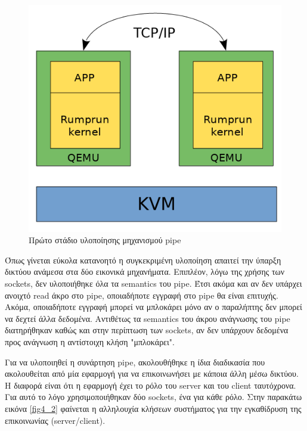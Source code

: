 \begin{figure}[htp]
\centering
\includegraphics[scale=0.7]{figures/pipe_stage1_function.png}
\caption{Πρώτο στάδιο υλοποίησης μηχανισμού pipe\label{fig4_1}}
\end{figure}

Όπως γίνεται εύκολα κατανοητό η συγκεκριμένη υλοποίηση απαιτεί την ύπαρξη
δικτύου ανάμεσα στα δύο εικονικά μηχανήματα. Επιπλέον, λόγω της χρήσης των
sockets, δεν υλοποιήθηκε όλα τα semantics του pipe. Έτσι ακόμα και αν δεν
υπάρχει ανοιχτό read άκρο στο pipe, οποιαδήποτε εγγραφή στο pipe θα είναι
επιτυχής. Ακόμα, οποιαδήποτε εγγραφή μπορεί να μπλοκάρει μόνο αν ο παραλήπτης
δεν μπορεί να δεχτεί άλλα δεδομένα. Αντιθέτως τα semantics του άκρου ανάγνωσης
του pipe διατηρήθηκαν καθώς και στην περίπτωση των sockets, αν δεν υπάρχουν
δεδομένα προς ανάγνωση η αντίστοιχη κλήση "μπλοκάρει". 

Για να υλοποιηθεί η συνάρτηση pipe, ακολουθήθηκε η ίδια διαδικασία που
ακολουθείται από μία εφαρμογή για να επικοινωνήσει με κάποια άλλη μέσω δικτύου.
Η διαφορά είναι ότι η εφαρμογή έχει το ρόλο του server και του client
ταυτόχρονα. Για αυτό το λόγο χρησιμοποιήθηκαν δύο sockets, ένα για κάθε ρόλο. 
Στην παρακάτω εικόνα \ref{fig4_2} φαίνεται η αλληλουχία κλήσεων συστήματος για
την εγκαθίδρυση της επικοινωνίας (server/client). 

